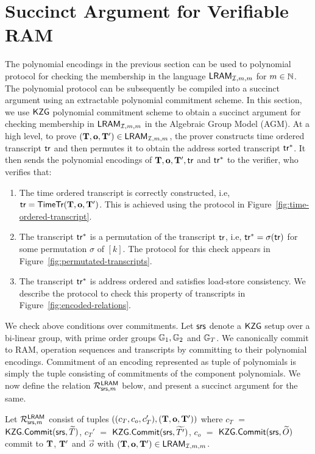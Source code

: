 \section{Succinct Argument for Verifiable RAM}\label{sec:poly-proto-ram}
The polynomial encodings in the previous section can be used to polynomial protocol for
checking the membership in the language $\mathsf{LRAM}_{\mathcal{I},m,m}$ for $m\in \mathbb{N}$. The polynomial protocol can be subsequently
be compiled into a succinct argument using an extractable polynomial commitment scheme.
In this section, we use $\mathsf{KZG}$ polynomial commitment scheme to obtain a succinct argument for checking membership in $\mathsf{LRAM}_{\mathcal{I},m,m}$
in the Algebraic Group Model (AGM).
At a high level, to prove $(\mathbf{T},\mathbf{o},\mathbf{T}')\in \mathsf{LRAM}_{\mathcal{I},m,m}$, the prover
constructs time ordered transcript $\mathsf{tr}$ and then permutes it to obtain the address sorted transcript $\mathsf{tr}^\ast$.
It then sends the polynomial encodings of $\mathbf{T},\mathbf{o},\mathbf{T}',\mathsf{tr}$ and $\mathsf{tr}^\ast$ to the verifier, who verifies that:
\begin{enumerate}[leftmargin=2em]
    \item The time ordered transcript is correctly constructed, i.e, $\mathsf{tr}=\mathsf{TimeTr}(\mathbf{T},\mathbf{o},\mathbf{T}')$.
     This is achieved using the protocol in Figure~\ref{fig:time-ordered-transcript}.
    \item The transcript $\mathsf{tr}^\ast$ is a permutation of the transcript $\mathsf{tr}$, i.e, $\mathsf{tr}^\ast=\sigma(\mathsf{tr})$ for some permutation $\sigma$ of $[k]$.
    The protocol for this check appears in Figure~\ref{fig:permutated-transcripts}.
    \item The transcript $\mathsf{tr}^\ast$ is address ordered and satisfies load-store consistency. We describe the protocol
    to check this property of transcripts in Figure~\ref{fig:encoded-relations}.
\end{enumerate}
We check above conditions over commitments. Let $\mathsf{srs}$ denote a $\mathsf{KZG}$ setup over a bi-linear group, with
prime order groups $\mathbb{G}_1, \mathbb{G}_2$ and $\mathbb{G}_T$. We canonically commit to RAM, operation sequences and transcripts by committing to their
polynomial encodings. Commitment of an encoding represented as tuple of polynomials is simply the tuple consisting of commitments of the component
polynomials. We now define
the relation $\mathcal{R}^{\mathsf{LRAM}}_{\mathsf{srs},m}$ below, and present a succinct argument for the same.
\begin{definition}\label{defn:committed-vram}
Let $\mathcal{R}^{\mathsf{LRAM}}_{\mathsf{srs},m}$ consist of tuples $((c_T, c_o, c_T'), (\mathbf{T}, \mathbf{o},\mathbf{T}'))$ where $c_T$ $=$ $\mathsf{KZG.Commit}(\mathsf{srs}, \widetilde{T})$,
$c_T'$ $=$ $\mathsf{KZG.Commit}(\mathsf{srs}, \widetilde{T'})$,
$c_o$ $=$ $\mathsf{KZG.Commit}(\mathsf{srs},\widetilde{O})$ commit to $\mathbf{T}$, $\mathbf{T}'$ and $\vec{o}$ with $(\mathbf{T},\mathbf{o},\mathbf{T}')\in \mathsf{LRAM}_{\mathcal{I},m,m}$.
\end{definition}
